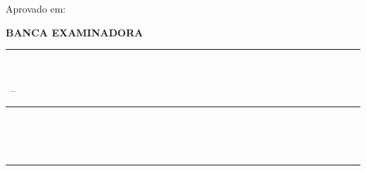 
\begin{center}
  
  {\MakeUppercase{\meuautor}}
  
  \vspace{1.5cm}
  
  {\bfseries\MakeUppercase{\meutitulo}%
  \ifdefempty{\meusubtitulo}{}{: \meusubtitulo}
  }
  
  \vspace{1.5cm}
  
  \begin{adjustwidth}{7cm}{0cm}
    \begin{spacing}{1.0}
      \textopresentacao
    \end{spacing}
  \end{adjustwidth}
  
  \vspace{1cm}
  
  \noindent
  Aprovado em: \dataaprovacao
  
  \vspace{1.5cm}
  
  \textbf{BANCA EXAMINADORA}
  
  \vspace{1.5cm}
  
  \begin{minipage}{10cm}
    \centering
    \rule{8cm}{0.4pt} \\ %
    \begin{spacing}{1.0}
      \small
      \meuorientador\ -- \titulacaoorientador \\
      \minhainstituicao
    \end{spacing}
  \end{minipage}
  
  \vfill
  
  \begin{minipage}{10cm}
    \centering
    \rule{8cm}{0.4pt} \\
    \begin{spacing}{1.0}
      \small
      \avaliadorum \\
      \instituicaoavaliadorum
    \end{spacing}
  \end{minipage}
  
  \vfill
  
  \begin{minipage}{10cm}
    \centering
    \rule{8cm}{0.4pt} \\
    \begin{spacing}{1.0}
      \small
      \avaliadordois \\
      \instituicaoavaliadordois
    \end{spacing}
  \end{minipage}

\end{center}
